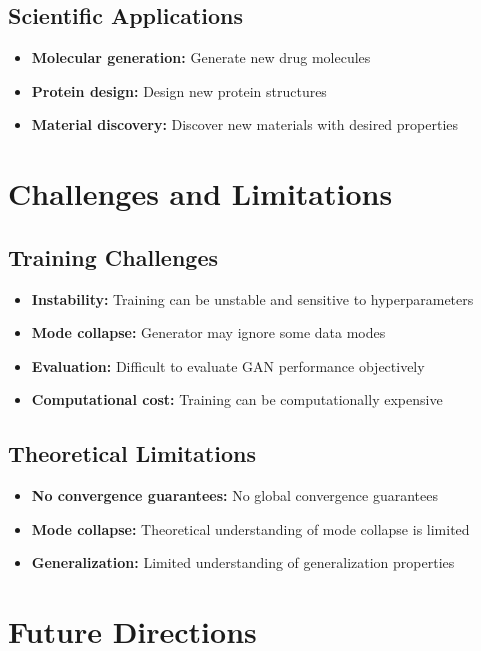 \subsection{Scientific Applications}

\begin{itemize}
    \item \textbf{Molecular generation:} Generate new drug molecules
    \item \textbf{Protein design:} Design new protein structures
    \item \textbf{Material discovery:} Discover new materials with desired properties
\end{itemize}

\section{Challenges and Limitations}

\subsection{Training Challenges}

\begin{itemize}
    \item \textbf{Instability:} Training can be unstable and sensitive to hyperparameters
    \item \textbf{Mode collapse:} Generator may ignore some data modes
    \item \textbf{Evaluation:} Difficult to evaluate GAN performance objectively
    \item \textbf{Computational cost:} Training can be computationally expensive
\end{itemize}

\subsection{Theoretical Limitations}

\begin{itemize}
    \item \textbf{No convergence guarantees:} No global convergence guarantees
    \item \textbf{Mode collapse:} Theoretical understanding of mode collapse is limited
    \item \textbf{Generalization:} Limited understanding of generalization properties
\end{itemize}

\section{Future Directions}

